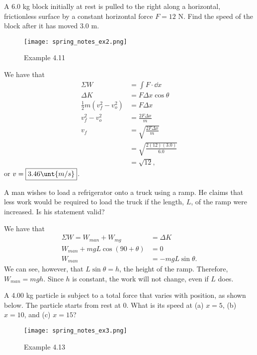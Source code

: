 \documentclass[11pt]{article}
\begin{document}
\begin{example}
	A 6.0 kg block initially at rest is pulled to the right along a horizontal, frictionless surface by a constant horizontal force $F = 12$ N. Find the speed of the block after it has moved 3.0 m.
\end{example}
\begin{figure}[h!]
	\centering
	\texttt{[image: spring\_notes\_ex2.png]}
	\caption{Example 4.11}
\end{figure}

\begin{solution}
	We have that
	\begin{align*}
		\Sigma W &= \int F \cdot \dd x \\
		\Delta K &= F \Delta x\cos\theta \\
		\frac{1}{2}m\left(v_f^2 - v_o^2\right) &= F\Delta x \\
		v_f^2 - v_o^2 &= \frac{2F\Delta x}{m} \\
		v_f &= \sqrt{\frac{2F\Delta x}{m}} \\
		&= \sqrt{\frac{2(12)(3.0)}{6.0}} \\
		&= \sqrt{12},
	\end{align*}
	or $v = \boxed{3.46\unt{m/s}}$.
\end{solution}

\begin{example}
 A man wishes to load a refrigerator onto a truck using a ramp. He claims that less work would be required to load the truck if the length, $L$, of the ramp were increased. Is his statement valid?
\end{example}
\begin{solution}
	We have that
	\begin{align*}
		\Sigma W = W_{man} + W_{mg} &= \Delta K \\
		W_{man} + mgL\cos(90+\theta) &= 0 \\
		W_{man} &= -mgL\sin\theta.
	\end{align*}
	We can see, however, that $L\sin\theta = h$, the height of the ramp. Therefore, $W_{man} = mgh$. Since $h$ is constant, the work will not change, even if $L$ does.
\end{solution}

\begin{example}
	A 4.00 kg particle is subject to a total force that varies with position, as shown below. The particle starts from rest at $0$. What is its speed at (a) $x = 5$, (b) $x= 10$, and (c) $x = 15$?
\end{example}
\begin{figure}[h!]
	\centering
	\texttt{[image: spring\_notes\_ex3.png]}
	\caption{Example 4.13}
\end{figure}
\end{document}
